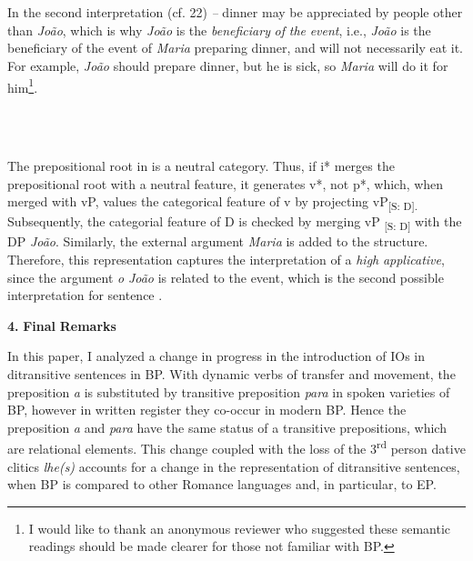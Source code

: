 \documentclass[output=paper,modfonts,nonflat]{langsci/langscibook}
\begin{document}
\ea%
    \label{ex:key:21}
    \gll\\
        \\
    \glt
    \z

        

 
\begin{styleHTMLPreformatted}
In the second interpretation (cf. 22) \textit{–} dinner may be appreciated by people other than \textit{João}, which is why \textit{João} is the \textit{beneficiary} \textit{of} \textit{the} \textit{event}, i.e., \textit{João} is the beneficiary of the event of \textit{Maria} preparing dinner, and will not necessarily eat it. For example, \textit{João} should prepare dinner, but he is sick, so \textit{Maria} will do it for him\footnote{ \textrm{I would like to thank an anonymous reviewer who suggested these semantic readings should be made clearer for those not familiar with BP.} }.
\end{styleHTMLPreformatted}

\bfseries

 

\ea%
    \label{ex:key:22}
    \gll\\
        \\
    \glt
    \z

        

\begin{styleHTMLPreformatted}
The prepositional root in  is a neutral category. Thus, if i* merges the prepositional root with a neutral feature, it generates v*, not p*, which, when merged with vP, values the categorical feature of v by projecting vP\textsubscript{[S: D].} Subsequently, the categorial feature of D is checked by merging vP \textsubscript{[S: D]} with the DP \textit{João}. Similarly, the external argument \textit{Maria} is added to the structure. Therefore, this representation captures the interpretation of a \textit{high} \textit{applicative}, since the argument \textit{o} \textit{João} is related to the event, which is the second possible interpretation for sentence .
\end{styleHTMLPreformatted}

\textbf{4.} \textbf{Final} \textbf{Remarks} 

In this paper, I analyzed a change in progress in the introduction of IOs in ditransitive sentences in BP. With dynamic verbs of transfer and movement, the preposition \textit{a} is substituted by transitive preposition \textit{para} in spoken varieties of BP, however in written register they co-occur in modern BP. Hence the preposition \textit{a} and \textit{para} have the same status of a transitive prepositions, which are relational elements. This change coupled with the loss of the 3\textsuperscript{rd} person dative clitics \textit{lhe(s)} accounts for a change in the representation of ditransitive sentences, when BP is compared to other Romance languages and, in particular, to EP.
\end{document}
